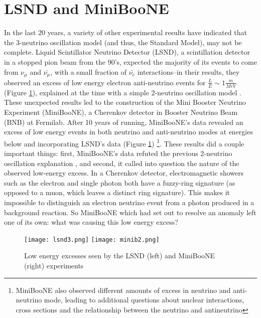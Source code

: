 \documentclass[12pt]{article}
\begin{document}
\section{LSND and MiniBooNE}
In the last 20 years, a variety of other experimental results have indicated that the 3-neutrino oscillation model (and thus, the Standard Model), may not be complete. Liquid Scintillator Neutrino Detector (LSND), a scintillation detector in a stopped pion beam from the 90's, expected the majority of its events to come from $\nu_\mu$ and $\bar{\nu_\mu}$, with a small fraction of $\bar{\nu_e}$ interactions--in their results, they observed an excess of low energy electron anti-neutrino events for $\frac{L}{E} \sim 1 \frac{m}{MeV}$ (Figure \ref{fig:lsnd}), explained at the time with a simple 2-neutrino oscillation model \cite{lsnd}. These unexpected results led to the construction of the Mini Booster Neutrino Experiment (MiniBooNE), a Cherenkov detector in Booster Neutrino Beam (BNB) at Fermilab. After 10 years of running, MiniBooNE's data revealed an excess of low energy events in both neutrino and anti-neutrino modes at energies below and incorporating LSND's data (Figure \ref{fig:lsnd}) \footnote{ MiniBooNE also observed different amounts of excess in neutrino and anti-neutrino mode, leading to additional questions about nuclear interactions, cross sections and the relationship between the neutrino and antineutrino\cite{miniboone}}.  These results did a couple important things: first, MiniBooNE's data refuted the previous 2-neutrino oscillation explanation \cite{miniboone}, and second, it called into question the nature of the observed low-energy excess. In a Cherenkov detector, electromagnetic showers such as the electron and single photon both have a fuzzy-ring signature (as opposed to a muon, which leaves a distinct ring signature). This makes it impossible to distinguish an electron neutrino event from a photon produced in a background reaction. So MiniBooNE which had set out to resolve an anomaly left one of its own: what was causing this low energy excess? 
\begin{figure}[h!]
\centering
\texttt{[image: lsnd3.png]}
\hspace{1.5 cm}
\texttt{[image: minib2.png]}
\caption{Low energy excesses seen by the LSND (left) and MiniBooNE (right) experiments}
\label{fig:lsnd}
\end{figure}


\end{document}

